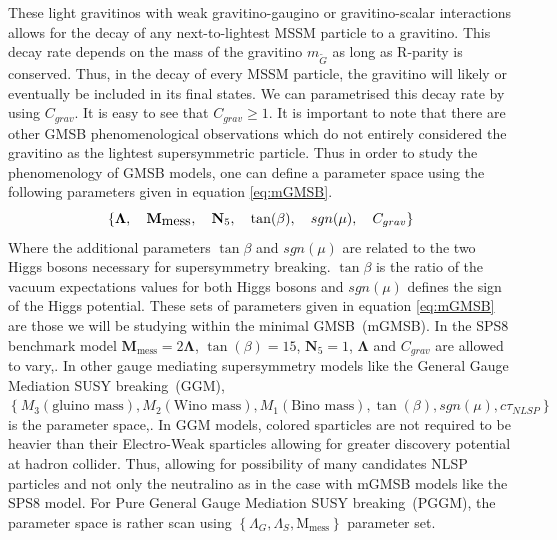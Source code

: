 { These light gravitinos with weak gravitino-gaugino or gravitino-scalar interactions allows for the decay of any next-to-lightest MSSM particle to a gravitino. This decay rate depends on the mass of the gravitino $m_{\tilde{G}}$ as long as R-parity is conserved. Thus, in the decay of every MSSM particle, the gravitino will likely or eventually be included in its final states. We can  parametrised this decay rate by using $C_{grav}$. It is easy to see that $C_{grav} \geq 1$. It is important to note that there are other GMSB phenomenological observations which do not entirely considered the gravitino as the lightest supersymmetric particle.
Thus in order to study the phenomenology of GMSB models, one can define a parameter space using the following parameters given in equation \ref{eq:mGMSB}. 
\begin{equation}{\label{eq:mGMSB}}
\left\{ \mathbf{\Lambda}, \quad \mathbf{M}_{\mbox{mess}},\quad \mathbf{N}_{5}, \quad \tan(\beta), \quad sgn(\mu),\quad C_{grav}\right\}
\end{equation}
Where the additional parameters  $\tan\beta$ and $sgn(\mu)$ are related to the two Higgs bosons necessary for supersymmetry breaking. $\tan\beta$ is the ratio of the vacuum expectations values for both Higgs bosons and $sgn(\mu)$ defines the sign of the Higgs potential.
These sets of parameters given in equation \ref{eq:mGMSB} are those we will be studying  within the minimal GMSB~(mGMSB). In the SPS8 benchmark model $\mathbf{M}_{\mbox{mess}} = 2\mathbf{\Lambda}$, $ \tan(\beta)=15$, $\mathbf{N}_{5}=1$, $\mathbf{\Lambda}$
and $C_{grav}$ are allowed to vary,\cite{SUSY}.
 In other gauge mediating supersymmetry models like the General Gauge Mediation SUSY breaking~(GGM), $\left\{M_{3}(\mbox{gluino mass}), M_{2}(\mbox{Wino mass}), M_{1}(\mbox{Bino mass}),\tan(\beta), sgn(\mu), c\tau_{NLSP}\right\}$
is the parameter space,\cite{GGM1,GGM2}.
In GGM models, colored sparticles are not required to be heavier than their Electro-Weak sparticles allowing for greater discovery potential at hadron collider\cite{DSHIH}. Thus, allowing for possibility of many candidates NLSP particles and not only the neutralino as in the case with mGMSB models like the SPS8 model.
For Pure General Gauge Mediation SUSY breaking~(PGGM), the parameter space is rather scan using $\displaystyle{\left\{\Lambda_{G},\Lambda_{S}, \mathrm{M}_{\mbox{mess}}\right\} }$ parameter set.
 
}
